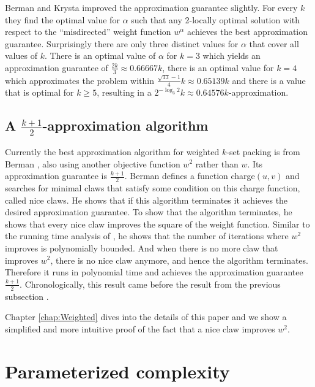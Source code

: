 Berman and Krysta \cite{BermanWeighted2} improved the approximation guarantee slightly. For every $k$ they find the optimal value for $\alpha$ such that any 2-locally optimal solution with respect to the ``misdirected'' weight function $w^\alpha$ achieves the best approximation guarantee. Surprisingly there are only three distinct values for $\alpha$ that cover all values of $k$. There is an optimal value of $\alpha$ for $k=3$ which yields an approximation guarantee of $\frac{2k}{3} \approx 0.66667k$, there is an optimal value for $k=4$ which approximates the problem within $\frac{\sqrt{13}-1}{4}k \approx 0.65139k$ and there is a value that is optimal for $k \geq 5$, resulting in a $2^{-\log_3 2}k \approx 0.64576k$-approximation.

\subsection{A $\frac{k+1}{2}$-approximation algorithm}\label{subsec:Berman}

Currently the best approximation algorithm for weighted $k$-set packing is from Berman \cite{Berman}, also using another objective function $w^2$ rather than $w$. Its approximation guarantee is $\frac{k+1}{2}$. Berman defines a function charge$(u,v)$ and searches for minimal claws that satisfy some condition on this charge function, called nice claws. He shows that if this algorithm terminates it achieves the desired approximation guarantee. To show that the algorithm terminates, he shows that every nice claw improves the square of the weight function. Similar to the running time analysis of \cite{Chandra}, he shows that the number of iterations where $w^2$ improves is polynomially bounded. And when there is no more claw that improves $w^2$, there is no nice claw anymore, and hence the algorithm terminates. Therefore it runs in polynomial time and achieves the approximation guarantee $\frac{k+1}{2}$. Chronologically, this result came before the result from the previous subsection \cite{BermanWeighted2}.

Chapter \ref{chap:Weighted} dives into the details of this paper and we show a simplified and more intuitive proof of the fact that a nice claw improves $w^2$.

\section{Parameterized complexity}\label{sec:Parameterized}

